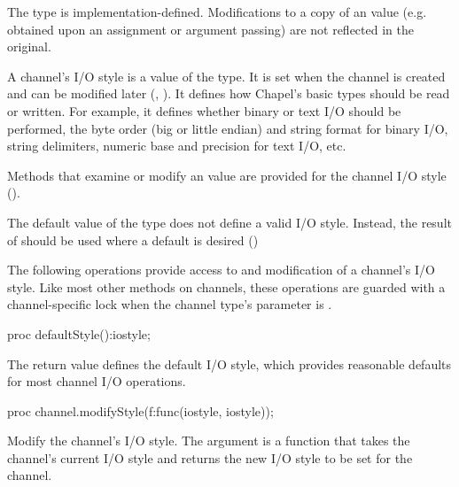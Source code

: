 The  type is implementation-defined.
Modifications to a copy of an  value (e.g.
obtained upon an assignment or argument passing)
are not reflected in the original.

A channel's I/O style is a value of the  type.
It is set when the channel is created and can be modified later
(, ).
It defines how Chapel's basic types should be read or written.
For example, it defines whether binary or text I/O
should be performed, the byte order (big or little endian)
and string format for binary I/O, string delimiters,
numeric base and precision for text I/O, etc.

Methods that examine or modify an  value
are provided for the channel I/O style
().

The default value of the  type does not define
a valid I/O style.
Instead, the result of  should be used where
a default is desired ()



\label{IO_channel_style_mods}

The following operations provide access to and modification of
a channel's I/O style. Like most other methods on channels,
these operations are guarded with a channel-specific lock
when the channel type's  parameter is .

\begin{protohead}
proc defaultStyle():iostyle;
\end{protohead}
\begin{protobody}
The return value defines the default I/O style,
which provides reasonable defaults for most channel I/O operations.
\end{protobody}

\begin{protohead}
proc channel.modifyStyle(f:func(iostyle, iostyle));
\end{protohead}
\begin{protobody}
Modify the channel's I/O style. The argument is
a function that takes the channel's current I/O style and returns
the new I/O style to be set for the channel.
\end{protobody}


